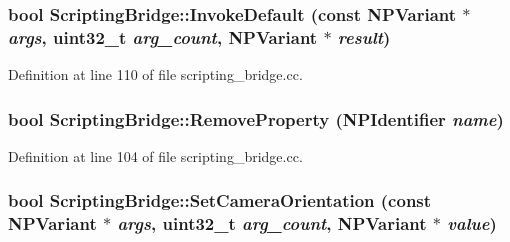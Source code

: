 \hypertarget{classtumbler_1_1_scripting_bridge_a2cee828951db15b4cce1074e934c4f97}{
\subsubsection[{InvokeDefault}]{\setlength{\rightskip}{0pt plus 5cm}bool ScriptingBridge::InvokeDefault (const NPVariant $\ast$ {\em args}, \/  uint32\_\-t {\em arg\_\-count}, \/  NPVariant $\ast$ {\em result})}}
\label{classtumbler_1_1_scripting_bridge_a2cee828951db15b4cce1074e934c4f97}


Definition at line 110 of file scripting\_\-bridge.cc.

\hypertarget{classtumbler_1_1_scripting_bridge_a861437163b8291eb7b302ce8f778022d}{
\subsubsection[{RemoveProperty}]{\setlength{\rightskip}{0pt plus 5cm}bool ScriptingBridge::RemoveProperty (NPIdentifier {\em name})}}
\label{classtumbler_1_1_scripting_bridge_a861437163b8291eb7b302ce8f778022d}


Definition at line 104 of file scripting\_\-bridge.cc.

\hypertarget{classtumbler_1_1_scripting_bridge_a9e581cb6e3f5ee07dbd818f0ee3dbb4d}{
\subsubsection[{SetCameraOrientation}]{\setlength{\rightskip}{0pt plus 5cm}bool ScriptingBridge::SetCameraOrientation (const NPVariant $\ast$ {\em args}, \/  uint32\_\-t {\em arg\_\-count}, \/  NPVariant $\ast$ {\em value})}}
\label{classtumbler_1_1_scripting_bridge_a9e581cb6e3f5ee07dbd818f0ee3dbb4d}


